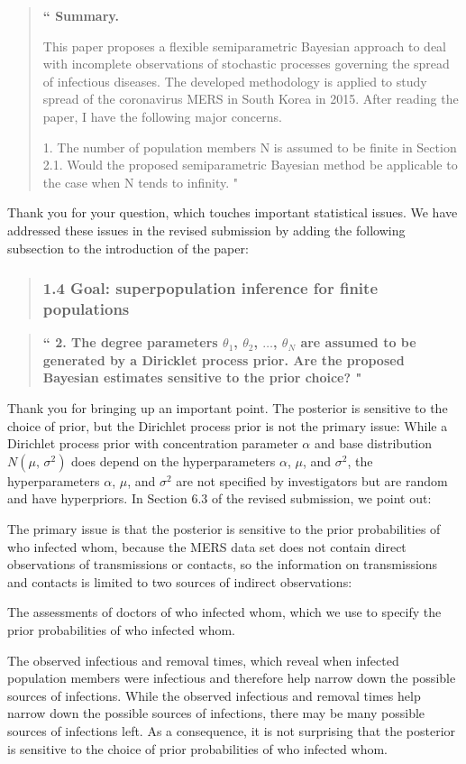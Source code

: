 \documentclass[12pt]{article}
\renewcommand{\=}{&=&}
\renewcommand{\bbq}{\vspace{.05cm}\begin{quote}\bf``}
\renewcommand{\ebq}{\hspace{-.15cm}"\end{quote}}
\newcommand{\bauthq}{\vspace{.05cm}\begin{quote}\em}
\newcommand{\eauthq}{\hspace{-.25cm}\end{quote}}
\renewcommand{\=}{&=&}
\begin{document}
\bbq
Summary. 

This paper proposes a flexible semiparametric Bayesian approach to deal with incomplete observations of stochastic processes governing the spread of infectious diseases. The developed methodology is applied to study spread of the coronavirus MERS in South Korea in 2015. After reading the paper, I have the following major concerns.

1. The number of population members N is assumed to be finite in Section 2.1. Would the proposed semiparametric Bayesian method be applicable to the case when N tends to infinity.
\ebq

Thank you for your question,
which touches important statistical issues.
We have addressed these issues in the revised submission by adding the following subsection to the introduction of the paper:
\vspace{-.4cm}
\bauthq
\subsubsection*{1.4 Goal: superpopulation inference for finite populations}
\eauthq

\bbq
2. The degree parameters $\theta_1$, $\theta_2$, $\dots$, $\theta_N$ are assumed to be generated by a Diricklet process prior. Are the proposed Bayesian estimates sensitive to the prior choice?
\ebq

Thank you for bringing up an important point.
The posterior is sensitive to the choice of prior,
but the Dirichlet process prior is not the primary issue:
While a Dirichlet process prior with concentration parameter $\alpha$ and base distribution $N(\mu,\, \sigma^2)$ does depend on the hyperparameters $\alpha$, $\mu$, and $\sigma^2$,
the hyperparameters $\alpha$, $\mu$, and $\sigma^2$ are not specified by investigators but are random and have hyperpriors.
In Section 6.3 of the revised submission,
we point out:
\bauthq

\eauthq
The primary issue is that the posterior is sensitive to the prior probabilities of who infected whom,
because the MERS data set does not contain direct observations of transmissions or contacts,
so the information on transmissions and contacts is limited to two sources of indirect observations:
\bi
\item The assessments of doctors of who infected whom,
which we use to specify the prior probabilities of who infected whom.
\item The observed infectious and removal times,
which reveal when infected population members were infectious and therefore help narrow down the possible sources of infections.
\ei
While the observed infectious and removal times help narrow down the possible sources of infections,
there may be many possible sources of infections left.
As a consequence,
it is not surprising that the posterior is sensitive to the choice of prior probabilities of who infected whom.
\end{document}
